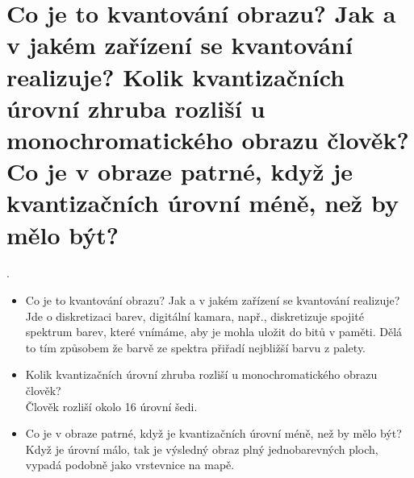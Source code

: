 \section{Co je to kvantování obrazu? Jak a v jakém zařízení se kvantování realizuje? Kolik kvantizačních úrovní zhruba 
rozliší u monochromatického obrazu člověk? Co je v obraze patrné, když je kvantizačních úrovní méně, než by mělo být?}.
\begin{itemize}
  \item{Co je to kvantování obrazu? Jak a v jakém zařízení se kvantování realizuje?\\}
    Jde o diskretizaci barev, digitální kamara, např., diskretizuje spojité spektrum barev, které vnímáme, aby je mohla uložit do bitů v paměti. Dělá to tím způsobem že barvě ze spektra přiřadí nejbližší barvu z palety.
  \item{Kolik kvantizačních úrovní zhruba rozliší u monochromatického obrazu člověk?\\}
    Člověk rozliší okolo 16 úrovní šedi.
  \item{Co je v obraze patrné, když je kvantizačních úrovní méně, než by mělo být?\\}
    Když je úrovní málo, tak je výsledný obraz plný jednobarevných ploch, vypadá podobně jako vrstevnice na mapě.
\end{itemize}
